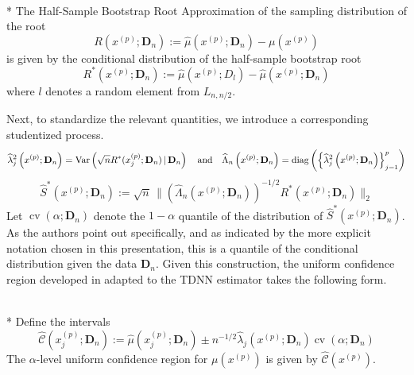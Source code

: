 \begin{boxD}
	\begin{dfn}\mbox{}\\*
		The Half-Sample Bootstrap Root Approximation of the sampling distribution of the root
		\begin{equation}
			R\left(x^{(p)}; \mathbf{D}_n\right)
			:= \hat{\mu}\left(x^{(p)}; \mathbf{D}_n\right) - \mu(x^{(p)})
		\end{equation}
		is given by the conditional distribution of the half-sample bootstrap root
		\begin{equation}
			R^{*}\left(x^{(p)}; \mathbf{D}_n\right)
			:= \hat{\mu}\left(x^{(p)}; D_l\right) - \hat{\mu}\left(x^{(p)}; \mathbf{D}_n\right)
		\end{equation}
		where $l$ denotes a random element from $L_{n, n/2}$.
	\end{dfn}
\end{boxD}

Next, to standardize the relevant quantities, we introduce a corresponding studentized process.
\begin{equation}
	\widehat{\lambda}_{j}^{2}\left(x^{(p)}; \mathbf{D}_n\right) = \text{Var}\left(\sqrt{n} R^{*}(x^{(p)}_{j}; \mathbf{D}_n) \, | \, \mathbf{D}_n\right)
	\quad \text{and} \quad
	\widehat{\Lambda}_n\left(x^{(p)}; \mathbf{D}_n\right) = \operatorname{diag}\left(\left\{\widehat{\lambda}_{j}^{2}\left(x^{(p)}; \mathbf{D}_n\right)\right\}_{j = 1}^{p}\right)
\end{equation}
\begin{equation}
	\hat{S}^{*}\left(x^{(p)}; \mathbf{D}_n\right)
	:= \sqrt{n} \, \Big\| \left(\hat{\Lambda}_n\left(x^{(p)}; \mathbf{D}_n\right)\right)^{-1/2} R^{*}\left(x^{(p)}; \mathbf{D}_n\right)\Big\|_{2}
\end{equation}
Let $\operatorname{cv}\left(\alpha; \mathbf{D}_n\right)$ denote the $1-\alpha$ quantile of the distribution of $\hat{S}^{*}\left(x^{(p)}; \mathbf{D}_n\right)$.
As the authors point out specifically, and as indicated by the more explicit notation chosen in this presentation, this is a quantile of the conditional distribution given the data $\mathbf{D}_n$.
Given this construction, the uniform confidence region developed in \citet{ritzwoller_uniform_2024} adapted to the TDNN estimator takes the following form.

\begin{boxD}
	\begin{thm}\mbox{}\\*
		Define the intervals
		\begin{equation}
			\hat{\mathcal{C}}\left(x^{(p)}_j; \mathbf{D}_n\right)
			:= \hat{\mu}\left(x^{(p)}_{j}; \mathbf{D}_n\right) \pm
			n^{-1/2} \hat{\lambda}_{j}\left(x^{(p)}; \mathbf{D}_n\right)\operatorname{cv}\left(\alpha; \mathbf{D}_n\right)
		\end{equation}
		The $\alpha$-level uniform confidence region for $\mu\left(x^{(p)}\right)$ is given by $\hat{\mathcal{C}}\left(x^{(p)}\right)$.
	\end{thm}
\end{boxD}

